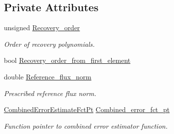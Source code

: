 \subsection*{Private Attributes}
\begin{DoxyCompactItemize}
\item 
unsigned \hyperlink{classoomph_1_1Z2ErrorEstimator_a9aafff3d80518811ba7d9bb12a240a7c}{Recovery\+\_\+order}
\begin{DoxyCompactList}\small\item\em Order of recovery polynomials. \end{DoxyCompactList}\item 
bool \hyperlink{classoomph_1_1Z2ErrorEstimator_afa024a307366bb987b1c9ba379b837e8}{Recovery\+\_\+order\+\_\+from\+\_\+first\+\_\+element}
\item 
double \hyperlink{classoomph_1_1Z2ErrorEstimator_aa170691c5d84fbf0eb6dc5f480bbb187}{Reference\+\_\+flux\+\_\+norm}
\begin{DoxyCompactList}\small\item\em Prescribed reference flux norm. \end{DoxyCompactList}\item 
\hyperlink{classoomph_1_1Z2ErrorEstimator_a75ef55e67b21ec49ed1a37d095cfa9f9}{Combined\+Error\+Estimate\+Fct\+Pt} \hyperlink{classoomph_1_1Z2ErrorEstimator_a34a013732989e82f50cb7e72f25632a7}{Combined\+\_\+error\+\_\+fct\+\_\+pt}
\begin{DoxyCompactList}\small\item\em Function pointer to combined error estimator function. \end{DoxyCompactList}\end{DoxyCompactItemize}



